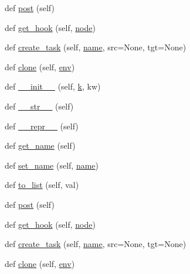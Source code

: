 \begin{DoxyCompactItemize}
\item 
def \hyperlink{classwaflib_1_1_task_gen_1_1task__gen_aa00dedae17f7fa03c169f0e4bdab7414}{post} (self)
\item 
def \hyperlink{classwaflib_1_1_task_gen_1_1task__gen_a19b53157d4411479cf8f55e0ef0edfec}{get\+\_\+hook} (self, \hyperlink{structnode}{node})
\item 
def \hyperlink{classwaflib_1_1_task_gen_1_1task__gen_ad432ecefdf2362d1cccf1dad31fac2d3}{create\+\_\+task} (self, \hyperlink{lib_2expat_8h_a1b49b495b59f9e73205b69ad1a2965b0}{name}, src=None, tgt=None)
\item 
def \hyperlink{classwaflib_1_1_task_gen_1_1task__gen_a7b7e036b797a0532ce6be8df951ba048}{clone} (self, \hyperlink{classwaflib_1_1_task_gen_1_1task__gen_a4d6f968ce8718fdf77d46ea3b56def1e}{env})
\item 
def \hyperlink{classwaflib_1_1_task_gen_1_1task__gen_a17ba35bed2219481190d515ffef57404}{\+\_\+\+\_\+init\+\_\+\+\_\+} (self, \hyperlink{rfft2d_test_m_l_8m_adc468c70fb574ebd07287b38d0d0676d}{k}, kw)
\item 
def \hyperlink{classwaflib_1_1_task_gen_1_1task__gen_a48c763160308a6ff809b7048702618b1}{\+\_\+\+\_\+str\+\_\+\+\_\+} (self)
\item 
def \hyperlink{classwaflib_1_1_task_gen_1_1task__gen_a040db536e5d7fe5054c9e9da52f36eb0}{\+\_\+\+\_\+repr\+\_\+\+\_\+} (self)
\item 
def \hyperlink{classwaflib_1_1_task_gen_1_1task__gen_a50370e76b549fc3bd0369c35f4fc1bab}{get\+\_\+name} (self)
\item 
def \hyperlink{classwaflib_1_1_task_gen_1_1task__gen_a79705c7a6b9b09021ee549e428c5a5c1}{set\+\_\+name} (self, \hyperlink{lib_2expat_8h_a1b49b495b59f9e73205b69ad1a2965b0}{name})
\item 
def \hyperlink{classwaflib_1_1_task_gen_1_1task__gen_a31a9f508654465cd5fe9f3baaaf77ec4}{to\+\_\+list} (self, val)
\item 
def \hyperlink{classwaflib_1_1_task_gen_1_1task__gen_aa00dedae17f7fa03c169f0e4bdab7414}{post} (self)
\item 
def \hyperlink{classwaflib_1_1_task_gen_1_1task__gen_a19b53157d4411479cf8f55e0ef0edfec}{get\+\_\+hook} (self, \hyperlink{structnode}{node})
\item 
def \hyperlink{classwaflib_1_1_task_gen_1_1task__gen_ad432ecefdf2362d1cccf1dad31fac2d3}{create\+\_\+task} (self, \hyperlink{lib_2expat_8h_a1b49b495b59f9e73205b69ad1a2965b0}{name}, src=None, tgt=None)
\item 
def \hyperlink{classwaflib_1_1_task_gen_1_1task__gen_a7b7e036b797a0532ce6be8df951ba048}{clone} (self, \hyperlink{classwaflib_1_1_task_gen_1_1task__gen_a4d6f968ce8718fdf77d46ea3b56def1e}{env})

\end{DoxyCompactItemize}
